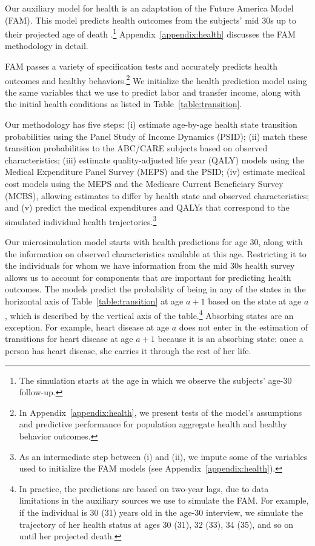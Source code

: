 Our auxiliary model for health is an adaptation of the Future America Model (FAM). This model predicts health outcomes from the subjects' mid 30s up to their projected age of death \citep{Goldman_etal_2015_Future-Elderly-Model-Report}.\footnote{The simulation starts at the age in which we observe the subjects' age-30 follow-up.}  Appendix~\ref{appendix:health} discusses the FAM methodology in detail.

FAM passes a variety of specification tests and accurately predicts health outcomes and healthy behaviors.\footnote{In  Appendix~\ref{appendix:health}, we present tests of the model's assumptions and predictive performance for population aggregate health and healthy behavior outcomes.} We initialize the health prediction model using the same variables that we use to predict labor and transfer income, along with the initial health conditions as listed in Table~\ref{table:transition}.

Our methodology has five steps: (i) estimate age-by-age health state transition probabilities using the Panel Study of Income Dynamics (PSID); (ii) match these transition probabilities to the ABC/CARE subjects based on observed characteristics; (iii) estimate quality-adjusted life year (QALY) models using the Medical Expenditure Panel Survey (MEPS) and the PSID; (iv) estimate medical cost models using the MEPS and the Medicare Current Beneficiary Survey (MCBS), allowing estimates to differ by health state and observed characteristics; and (v) predict the medical expenditures and QALYs that correspond to the simulated individual health trajectories.\footnote{As an intermediate step between (i) and (ii), we impute some of the variables used to initialize the FAM models (see  Appendix~\ref{appendix:health}).}

Our microsimulation model starts with health predictions for age 30, along with the information on observed characteristics available at this age. Restricting it to the individuals for whom we have information from the mid 30s health survey allows us to account for components that are important for predicting health outcomes. The models predict the probability of being in any of the states in the horizontal axis of Table~\ref{table:transition} at age $a+1$ based on the state at age $a$, which is described by the vertical axis of the table.\footnote{In practice, the predictions are based on two-year lags, due to data limitations in the auxiliary sources we use to simulate the FAM. For example, if the individual is 30 (31) years old in the age-30 interview, we simulate the trajectory of her health status at ages 30 (31), 32 (33), 34 (35), and so on until her projected death.} Absorbing states are an exception. For example, heart disease at age $a$ does not enter in the estimation of transitions for heart disease at age $a+1$ because it is an absorbing state: once a person has heart disease, she carries it through the rest of her life.

